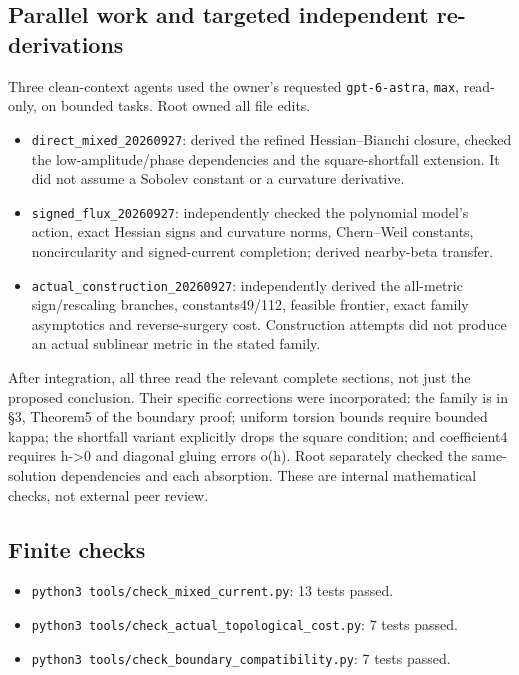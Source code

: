 \documentclass[
  10pt,
]{article}
\providecommand{\tightlist}{%
  \setlength{\itemsep}{0pt}\setlength{\parskip}{0pt}}
\begin{document}
\hypertarget{parallel-work-and-targeted-independent-re-derivations}{%
\subsection{Parallel work and targeted independent
re-derivations}\label{parallel-work-and-targeted-independent-re-derivations}}

Three clean-context agents used the owner's requested
\texttt{gpt-6-astra}, \texttt{max}, read-only, on bounded tasks. Root
owned all file edits.

\begin{itemize}
\tightlist
\item
  \texttt{direct\_mixed\_20260927}: derived the refined Hessian--Bianchi
  closure, checked the low-amplitude/phase dependencies and the
  square-shortfall extension. It did not assume a Sobolev constant or a
  curvature derivative.
\item
  \texttt{signed\_flux\_20260927}: independently checked the polynomial
  model's action, exact Hessian signs and curvature norms, Chern--Weil
  constants, noncircularity and signed-current completion; derived
  nearby-beta transfer.
\item
  \texttt{actual\_construction\_20260927}: independently derived the
  all-metric sign/rescaling branches, constants49/112, feasible
  frontier, exact family asymptotics and reverse-surgery cost.
  Construction attempts did not produce an actual sublinear metric in
  the stated family.
\end{itemize}

After integration, all three read the relevant complete sections, not
just the proposed conclusion. Their specific corrections were
incorporated: the family is in §3, Theorem5 of the boundary proof;
uniform torsion bounds require bounded kappa; the shortfall variant
explicitly drops the square condition; and coefficient4 requires
h-\textgreater0 and diagonal gluing errors o(h). Root separately checked
the same-solution dependencies and each absorption. These are internal
mathematical checks, not external peer review.

\hypertarget{finite-checks}{%
\subsection{Finite checks}\label{finite-checks}}

\begin{itemize}
\tightlist
\item
  \texttt{python3\ tools/check\_mixed\_current.py}: 13 tests passed.
\item
  \texttt{python3\ tools/check\_actual\_topological\_cost.py}: 7 tests
  passed.
\item
  \texttt{python3\ tools/check\_boundary\_compatibility.py}: 7 tests
  passed.
\end{itemize}
\end{document}
